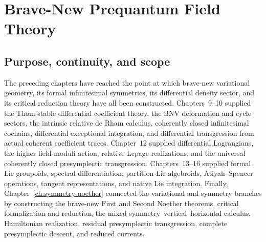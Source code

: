 
\chapter{Brave-New Prequantum Field Theory}
\label{ch:prequantum}

\section{Purpose, continuity, and scope}
\label{sec:prequantum-purpose-continuity-scope}

The preceding chapters have reached the point at which brave-new variational
geometry, its formal infinitesimal symmetries, its differential density sector,
and its critical reduction theory have all been constructed.  Chapters~9--10
supplied the Thom-stable differential coefficient theory, the BNV deformation and
cycle sectors, the intrinsic relative de Rham calculus, coherently closed
infinitesimal cochains, differential exceptional integration, and differential
transgression from actual coherent coefficient traces.  Chapter~12 supplied
differential Lagrangians, the higher field-moduli action, relative Lepage
realizations, and the universal coherently closed presymplectic transgression.
Chapters~13--16 supplied formal Lie groupoids, spectral differentiation,
partition-Lie algebroids, Atiyah--Spencer operations, tangent representations,
and native Lie integration.  Finally, Chapter~\ref{ch:symmetry-noether} connected
the variational and symmetry branches by constructing the brave-new First and
Second Noether theorems, critical formalization and reduction, the mixed
symmetry--vertical--horizontal calculus, Hamiltonian realization, residual
presymplectic transgression, complete presymplectic descent, and reduced currents.

